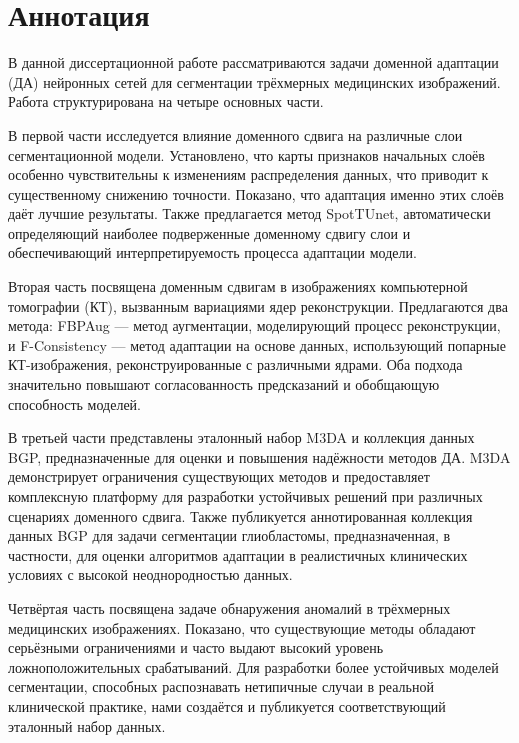 \chapter*{Аннотация}

В данной диссертационной работе рассматриваются задачи доменной адаптации (ДА) нейронных сетей для сегментации трёхмерных медицинских изображений. Работа структурирована на четыре основных части.

В первой части исследуется влияние доменного сдвига на различные слои сегментационной модели. Установлено, что карты признаков начальных слоёв особенно чувствительны к изменениям распределения данных, что приводит к существенному снижению точности. Показано, что адаптация именно этих слоёв даёт лучшие результаты. Также предлагается метод SpotTUnet, автоматически определяющий наиболее подверженные доменному сдвигу слои и обеспечивающий интерпретируемость процесса адаптации модели.

Вторая часть посвящена доменным сдвигам в изображениях компьютерной томографии (КТ), вызванным вариациями ядер реконструкции. Предлагаются два метода: FBPAug --- метод аугментации, моделирующий процесс реконструкции, и F-Consistency --- метод адаптации на основе данных, использующий попарные КТ-изображения, реконструированные с различными ядрами. Оба подхода значительно повышают согласованность предсказаний и обобщающую способность моделей.%

В третьей части представлены эталонный набор M3DA и коллекция данных BGP, предназначенные для оценки и повышения надёжности методов ДА. M3DA демонстрирует ограничения существующих методов и предоставляет комплексную платформу для разработки устойчивых решений при различных сценариях доменного сдвига. Также публикуется аннотированная коллекция данных BGP для задачи сегментации глиобластомы, предназначенная, в частности, для оценки алгоритмов адаптации в реалистичных клинических условиях с высокой неоднородностью данных.

Четвёртая часть посвящена задаче обнаружения аномалий в трёхмерных медицинских изображениях. Показано, что существующие методы обладают серьёзными ограничениями и часто выдают высокий уровень ложноположительных срабатываний. Для разработки более устойчивых моделей сегментации, способных распознавать нетипичные случаи в реальной клинической практике, нами создаётся и публикуется соответствующий эталонный набор данных.

